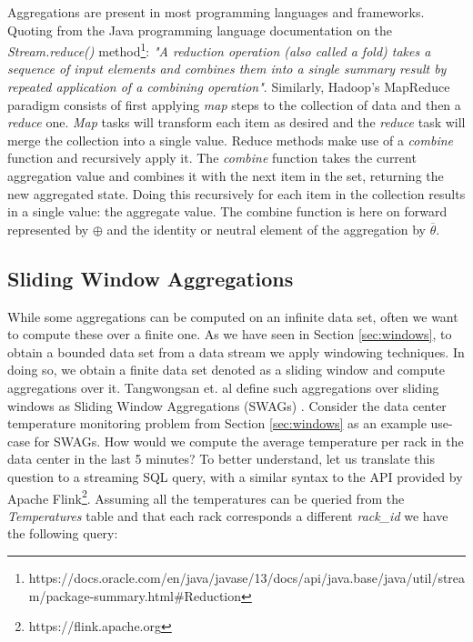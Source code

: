 Aggregations are present in most programming languages and frameworks. Quoting from the Java programming language documentation on the \textit{Stream.reduce()} method\footnote{https://docs.oracle.com/en/java/javase/13/docs/api/java.base/java/util/stream/package-summary.html\#Reduction}: 
\textit{"A reduction operation (also called a fold) takes a sequence of input elements and combines them into a single summary result by repeated application of a combining operation"}. Similarly, Hadoop's MapReduce paradigm consists of first applying \textit{map} steps to the collection of data and then a \textit{reduce} one. \textit{Map} tasks will transform each item as desired and the \textit{reduce} task will merge the collection into a single value. Reduce methods make use of a \textit{combine} function and recursively apply it. The \textit{combine} function takes the current aggregation value and combines it with the next item in the set, returning the new aggregated state. Doing this recursively for each item in the collection results in a single value: the aggregate value. The combine function is here on forward represented by $\oplus$ and the identity or neutral element of the aggregation by $\overline{\theta}$.

\subsection{Sliding Window Aggregations}

While some aggregations can be computed on an infinite data set, often we want to compute these over a finite one. As we have seen in Section \ref{sec:windows}, to obtain a bounded data set from a data stream we apply windowing techniques. In doing so, we obtain a finite data set denoted as a sliding window and compute aggregations over it. Tangwongsan et. al define such aggregations over sliding windows as Sliding Window Aggregations (SWAGs) \cite{Tangwongsan-Sliding-Window-Aggregation-Algorithms}. Consider the data center temperature monitoring problem from Section \ref{sec:windows} as an example use-case for SWAGs. How would we compute the average temperature per rack in the data center in the last 5 minutes? To better understand, let us translate this question to a streaming SQL query, with a similar syntax to the API provided by Apache Flink\footnote{https://flink.apache.org}. Assuming all the temperatures can be queried from the \textit{Temperatures} table and that each rack corresponds a different \textit{rack\_id} we have the following query:

